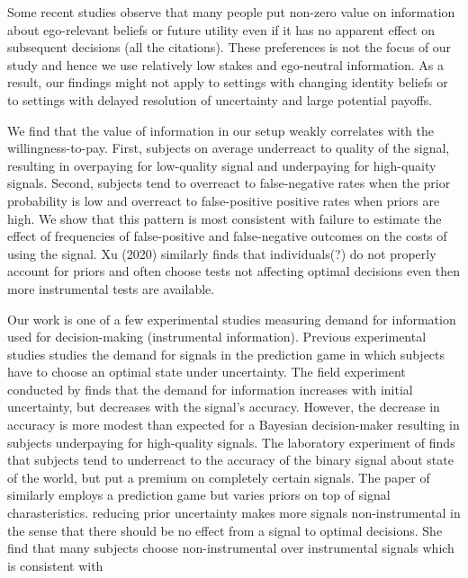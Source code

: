 \documentclass[12pt,a4paper]{article}
\begin{document}
Some recent studies observe that many people put non-zero value on information about ego-relevant beliefs or future utility even if it has no apparent effect on subsequent decisions (all the citations). These preferences is not the focus of our study and hence we use relatively low stakes and ego-neutral information. As a result, our findings might not apply to settings with changing identity beliefs or to settings with delayed resolution of uncertainty and large potential payoffs. 

We find that the value of information in our setup weakly correlates with the willingness-to-pay. First, subjects on average underreact to quality of the signal, resulting in overpaying for low-quality signal and underpaying for high-quaity signals. Second, subjects tend to overreact to false-negative rates when the prior probability is low and overreact to false-positive positive rates when priors are high. We show that this pattern is most consistent with failure to estimate the effect of frequencies of false-positive and false-negative outcomes on the costs of using the signal. Xu (2020) similarly finds that individuals(?) do not properly account for priors and often choose tests not affecting optimal decisions even then more instrumental tests are available.

Our work is one of a few experimental studies measuring demand for information used for decision-making (instrumental information). Previous experimental studies studies the demand for signals in the prediction game in which subjects have to choose an optimal state under uncertainty. The field experiment conducted by \citep{hoffman_how_2016} finds that the demand for information increases with initial uncertainty, but decreases with the signal's accuracy. However, the decrease in accuracy is more modest than expected for a Bayesian decision-maker resulting in subjects underpaying for high-quality signals. The laboratory experiment of \citet{ambuehl_belief_2018} finds that subjects tend to underreact to the accuracy of the binary signal about state of the world, but put a premium on completely certain signals. The paper of \citet{xu_revealed_2020} similarly employs a prediction game but varies priors on top of signal charasteristics. reducing prior uncertainty makes more signals non-instrumental in the sense that there should be no effect from a signal to optimal decisions.  She find that many subjects choose non-instrumental over instrumental signals which is consistent with
\end{document}
